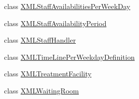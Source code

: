 \begin{DoxyCompactItemize}
\item 
class \hyperlink{class_general_health_care_elements_1_1_input_1_1_x_m_l_input_classes_1_1_x_m_l_staff_availabilities_per_week_day}{X\+M\+L\+Staff\+Availabilities\+Per\+Week\+Day}
\item 
class \hyperlink{class_general_health_care_elements_1_1_input_1_1_x_m_l_input_classes_1_1_x_m_l_staff_availability_period}{X\+M\+L\+Staff\+Availability\+Period}
\item 
class \hyperlink{class_general_health_care_elements_1_1_input_1_1_x_m_l_input_classes_1_1_x_m_l_staff_handler}{X\+M\+L\+Staff\+Handler}
\item 
class \hyperlink{class_general_health_care_elements_1_1_input_1_1_x_m_l_input_classes_1_1_x_m_l_time_line_per_weekday_definition}{X\+M\+L\+Time\+Line\+Per\+Weekday\+Definition}
\item 
class \hyperlink{class_general_health_care_elements_1_1_input_1_1_x_m_l_input_classes_1_1_x_m_l_treatment_facility}{X\+M\+L\+Treatment\+Facility}
\item 
class \hyperlink{class_general_health_care_elements_1_1_input_1_1_x_m_l_input_classes_1_1_x_m_l_waiting_room}{X\+M\+L\+Waiting\+Room}
\end{DoxyCompactItemize}
